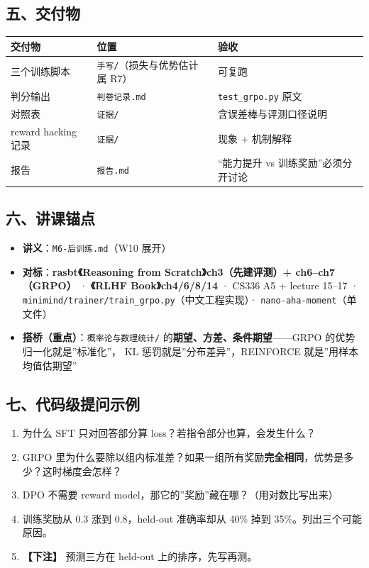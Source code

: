 \documentclass[
  chinese,
  11pt,
]{ctexart}
\newcounter{none} %
\providecommand{\tightlist}{%
  \setlength{\itemsep}{0pt}\setlength{\parskip}{0pt}}
\begin{document}
\subsection{五、交付物}\label{ux4e94ux4ea4ux4ed8ux7269}

{\def\LTcaptype{none} %
\begin{longtable}[]{@{}lll@{}}
\toprule\noalign{}
交付物 & 位置 & 验收 \\
\midrule\noalign{}
\endhead
\bottomrule\noalign{}
\endlastfoot
三个训练脚本 & \texttt{手写/}（损失与优势估计属 R7） & 可复跑 \\
判分输出 & \texttt{判卷记录.md} & \texttt{test\_grpo.py} 原文 \\
对照表 & \texttt{证据/} & 含误差棒与评测口径说明 \\
reward hacking 记录 & \texttt{证据/} & 现象 + 机制解释 \\
报告 & \texttt{报告.md} & ``能力提升 vs 训练奖励''必须分开讨论 \\
\end{longtable}
}

\subsection{六、讲课锚点}\label{ux516dux8bb2ux8bfeux951aux70b9}

\begin{itemize}
\tightlist
\item
  \textbf{讲义}：\texttt{M6-后训练.md}（W10 展开）
\item
  \textbf{对标}：\textbf{rasbt《Reasoning from Scratch》ch3（先建评测）+ ch6--ch7（GRPO）} · \textbf{《RLHF Book》ch4/6/8/14} · CS336 A5 + lecture 15--17 · \texttt{minimind/trainer/train\_grpo.py}（中文工程实现）· \texttt{nano-aha-moment}（单文件）
\item
  \textbf{搭桥（重点）}：\texttt{概率论与数理统计/} 的\textbf{期望、方差、条件期望}------GRPO 的优势归一化就是''标准化''， KL 惩罚就是''分布差异''，REINFORCE 就是''用样本均值估期望''
\end{itemize}

\subsection{七、代码级提问示例}\label{ux4e03ux4ee3ux7801ux7ea7ux63d0ux95eeux793aux4f8b}

\begin{enumerate}
\def\labelenumi{\arabic{enumi}.}
\tightlist
\item
  为什么 SFT 只对回答部分算 loss？若指令部分也算，会发生什么？
\item
  GRPO 里为什么要除以组内标准差？如果一组所有奖励\textbf{完全相同}，优势是多少？这时梯度会怎样？
\item
  DPO 不需要 reward model，那它的''奖励''藏在哪？（用对数比写出来）
\item
  训练奖励从 0.3 涨到 0.8，held-out 准确率却从 40\% 掉到 35\%。列出三个可能原因。
\item
  \textbf{【下注】} 预测三方在 held-out 上的排序，先写再测。
\end{enumerate}
\end{document}
